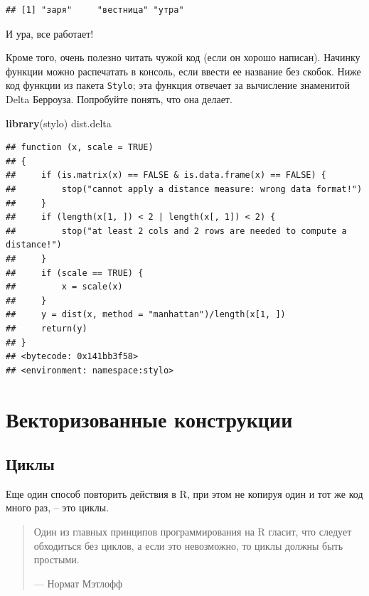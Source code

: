 \documentclass[
]{book}
\newenvironment{Shaded}{\begin{snugshade}}{\end{snugshade}}
\newcommand{\FunctionTok}[1]{\textcolor[rgb]{0.13,0.29,0.53}{\textbf{#1}}}
\newcommand{\NormalTok}[1]{#1}
\theoremstyle{definition}
\theoremstyle{definition}
\theoremstyle{definition}
\theoremstyle{definition}
\theoremstyle{remark}
\begin{document}
\begin{verbatim}
## [1] "заря"     "вестница" "утра"
\end{verbatim}

И ура, все работает!

Кроме того, очень полезно читать чужой код (если он хорошо написан). Начинку функции можно распечатать в консоль, если ввести ее название без скобок. Ниже код функции из пакета \texttt{Stylo}; эта функция отвечает за вычисление знаменитой Delta Берроуза. Попробуйте понять, что она делает.

\begin{Shaded}
\begin{Highlighting}[]
\FunctionTok{library}\NormalTok{(stylo)}
\NormalTok{dist.delta}
\end{Highlighting}
\end{Shaded}

\begin{verbatim}
## function (x, scale = TRUE) 
## {
##     if (is.matrix(x) == FALSE & is.data.frame(x) == FALSE) {
##         stop("cannot apply a distance measure: wrong data format!")
##     }
##     if (length(x[1, ]) < 2 | length(x[, 1]) < 2) {
##         stop("at least 2 cols and 2 rows are needed to compute a distance!")
##     }
##     if (scale == TRUE) {
##         x = scale(x)
##     }
##     y = dist(x, method = "manhattan")/length(x[1, ])
##     return(y)
## }
## <bytecode: 0x141bb3f58>
## <environment: namespace:stylo>
\end{verbatim}

\hypertarget{ux432ux435ux43aux442ux43eux440ux438ux437ux43eux432ux430ux43dux43dux44bux435-ux43aux43eux43dux441ux442ux440ux443ux43aux446ux438ux438}{%
\section{Векторизованные конструкции}\label{ux432ux435ux43aux442ux43eux440ux438ux437ux43eux432ux430ux43dux43dux44bux435-ux43aux43eux43dux441ux442ux440ux443ux43aux446ux438ux438}}

\hypertarget{ux446ux438ux43aux43bux44b}{%
\subsection{Циклы}\label{ux446ux438ux43aux43bux44b}}

Еще один способ повторить действия в R, при этом не копируя один и тот же код много раз, -- это циклы.

\begin{quote}
Один из главных принципов программирования на R гласит, что следует обходиться без циклов, а если это невозможно, то циклы должны быть простыми.

--- Нормат Мэтлофф
\end{quote}
\end{document}
